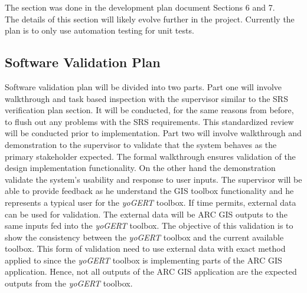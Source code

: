 \documentclass[12pt, titlepage]{article}
\begin{document}


The section was done in the development plan document Sections 6 and 7. \\

The details of this section will likely evolve further
in the project. Currently the plan is to only use 
automation testing for unit tests. 

\subsection{Software Validation Plan}

  
Software validation plan will be divided into two parts. Part one will involve walkthrough and task based inspection with the supervisor similar to the SRS 
verification plan section. It will be conducted, for the same reasons from before, to flush out any problems with the SRS requirements. This standardized review will be conducted prior to implementation. Part two will involve walkthrough and demonstration to the supervisor to validate that the system behaves as the primary stakeholder expected. The formal walkthrough ensures validation of the design implementation functionality. On the other hand the demonstration validate the system's usability and response to user inputs. The supervisor will be able to provide feedback as he understand the GIS toolbox functionality and he represents a typical user for the \emph{yoGERT} toolbox. 
If time permits, external data can be used for validation. The external data will be ARC GIS outputs to the same inputs fed into the \emph{yoGERT} toolbox. The objective of this validation is to show the consistency between the \emph{yoGERT} toolbox and the current available toolbox. This form of validation need to use external data with exact method applied to since the \emph{yoGERT} toolbox is implementing parts of the ARC GIS application. Hence, not all outputs of the ARC GIS application are the expected outputs from the \emph{yoGERT} toolbox.

\end{document}
